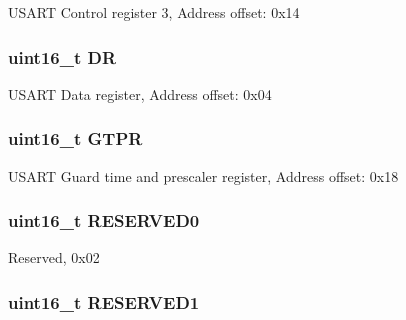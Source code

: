 U\-S\-A\-R\-T Control register 3, Address offset\-: 0x14 \hypertarget{struct_u_s_a_r_t___type_def_a0a1acc0425516ff7969709d118b96a3b}{
\subsubsection[{D\-R}]{ uint16\-\_\-t D\-R}}\label{struct_u_s_a_r_t___type_def_a0a1acc0425516ff7969709d118b96a3b}
U\-S\-A\-R\-T Data register, Address offset\-: 0x04 \hypertarget{struct_u_s_a_r_t___type_def_a26f8b74978e03c8a4c99c9395a6a524d}{
\subsubsection[{G\-T\-P\-R}]{ uint16\-\_\-t G\-T\-P\-R}}\label{struct_u_s_a_r_t___type_def_a26f8b74978e03c8a4c99c9395a6a524d}
U\-S\-A\-R\-T Guard time and prescaler register, Address offset\-: 0x18 \hypertarget{struct_u_s_a_r_t___type_def_a149feba01f9c4a49570c6d88619f504f}{
\subsubsection[{R\-E\-S\-E\-R\-V\-E\-D0}]{\setlength{\rightskip}{0pt plus 5cm}uint16\-\_\-t R\-E\-S\-E\-R\-V\-E\-D0}}\label{struct_u_s_a_r_t___type_def_a149feba01f9c4a49570c6d88619f504f}
Reserved, 0x02 \hypertarget{struct_u_s_a_r_t___type_def_a8249a3955aace28d92109b391311eb30}{
\subsubsection[{R\-E\-S\-E\-R\-V\-E\-D1}]{\setlength{\rightskip}{0pt plus 5cm}uint16\-\_\-t R\-E\-S\-E\-R\-V\-E\-D1}}\label{struct_u_s_a_r_t___type_def_a8249a3955aace28d92109b391311eb30}
